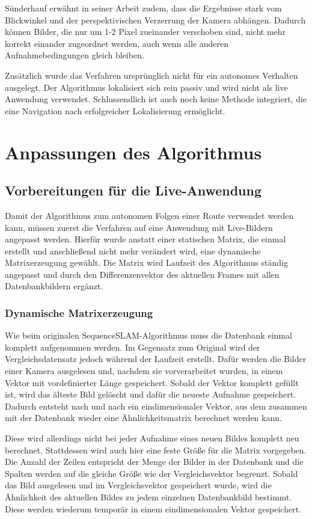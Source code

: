 \documentclass[12pt,a4paper,titlepage]{scrartcl}
\begin{document}
Sünderhauf erwähnt in seiner Arbeit zudem, dass die Ergebnisse stark vom Blickwinkel und der perspektivischen Verzerrung der Kamera abhängen. Dadurch können Bilder, die nur um 1-2 Pixel zueinander verschoben sind, nicht mehr korrekt einander zugeordnet werden, auch wenn alle anderen Aufnahmebedingungen gleich bleiben. 

Zusätzlich wurde das Verfahren ursprünglich nicht für ein autonomes Verhalten ausgelegt. Der Algorithmus lokalisiert sich rein passiv und wird nicht als live Anwendung verwendet. Schlussendlich ist auch noch keine Methode integriert, die eine Navigation nach erfolgreicher Lokalisierung ermöglicht. 
\pagebreak
\section{Anpassungen des Algorithmus}
\subsection{Vorbereitungen für die Live-Anwendung} 
Damit der Algorithmus zum autonomen Folgen einer Route verwendet werden kann, müssen zuerst die Verfahren auf eine Anwendung mit Live-Bildern angepasst werden. Hierfür wurde anstatt einer statischen Matrix, die einmal erstellt und anschließend nicht mehr verändert wird, eine dynamische Matrixerzeugung gewählt. Die Matrix wird Laufzeit des Algorithmus ständig angepasst und durch den Differenzenvektor des aktuellen Frames mit allen Datenbankbildern ergänzt.
\subsubsection{Dynamische Matrixerzeugung}
Wie beim originalen SequenceSLAM-Algorithmus muss die Datenbank einmal komplett aufgenommen werden. Im Gegensatz zum Original wird der Vergleichsdatensatz jedoch während der Laufzeit erstellt. Dafür werden die Bilder einer Kamera ausgelesen und, nachdem sie vorverarbeitet wurden, in einem Vektor mit vordefinierter Länge gespeichert. Sobald der Vektor komplett gefüllt ist, wird das älteste Bild gelöscht und dafür die neueste Aufnahme gespeichert. Dadurch entsteht nach und nach ein eindimensionaler Vektor, aus dem zusammen mit der Datenbank wieder eine Ähnlichkeitsmatrix berechnet werden kann.

Diese wird allerdings nicht bei jeder Aufnahme eines neuen Bildes komplett neu berechnet. Stattdessen wird auch hier eine feste Größe für die Matrix vorgegeben. Die Anzahl der Zeilen entspricht der Menge der Bilder in der Datenbank und die Spalten werden auf die gleiche Größe wie der Vergleichsvektor begrenzt. Sobald das Bild ausgelesen und im Vergleichsvektor gespeichert wurde, wird die Ähnlichkeit des aktuellen Bildes zu jedem einzelnen Datenbankbild bestimmt. Diese werden wiederum temporär in einem eindimensionalen Vektor gespeichert.
\end{document}
